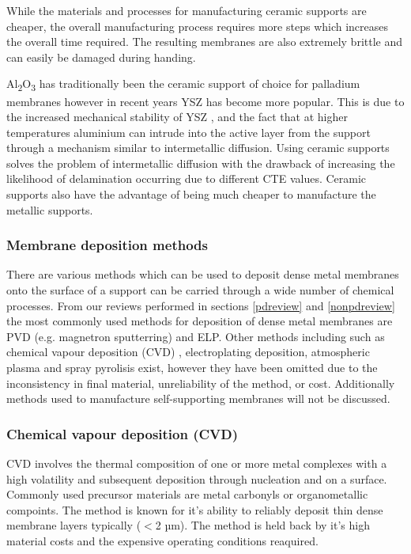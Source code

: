 While the materials and processes for manufacturing ceramic supports are cheaper, the overall manufacturing process requires more steps which increases the overall time required. The resulting membranes are also extremely brittle and can easily be damaged during handing. 

Al\textsubscript{2}O\textsubscript{3} has traditionally been the ceramic support of choice for palladium membranes however in recent years YSZ has become more popular. This is due to the increased mechanical stability of YSZ \cite{Hayashi2005}, and the fact that at higher temperatures aluminium can intrude into the active layer from the support through a mechanism similar to intermetallic diffusion.\cite{Atsonios2015} Using ceramic supports solves the problem of intermetallic diffusion with the drawback of increasing the likelihood of delamination occurring due to different CTE values. Ceramic supports also have the advantage of being much cheaper to manufacture the metallic supports. \cite{Atsonios2015}

\subsubsection{Membrane deposition methods}
There are various methods which can be used to deposit dense metal membranes onto the surface of a support can be carried through a wide number of chemical processes. From our reviews performed in sections \ref{pdreview} and \ref{nonpdreview} the most commonly used methods for deposition of dense metal membranes are PVD (e.g. magnetron sputterring) and ELP. Other methods including such as chemical vapour deposition (CVD) \cite{Yun2011a, Wang2006a, David2011a}, electroplating deposition, atmospheric plasma \cite{HUANG2007160} and spray pyrolisis \cite{LI1993247} exist, however they have been omitted due to the inconsistency in final material, unreliability of the method, or cost. Additionally methods used to manufacture self-supporting membranes will not be discussed.

\subsubsection*{Chemical vapour deposition (CVD)}
CVD involves the thermal composition of one or more metal complexes with a high volatility and subsequent deposition through nucleation and on a surface. Commonly used precursor materials are metal carbonyls or organometallic compoints. The method is known for it's ability to reliably deposit thin dense membrane layers typically ($<$2 µm). The method is held back by it's high material costs and the expensive operating conditions reaquired.\cite{Yun2011a, Basile2008} 

